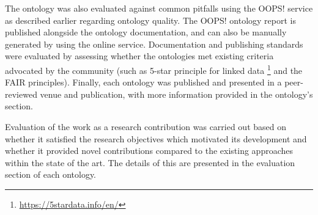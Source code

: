 The ontology was also evaluated against common pitfalls using the OOPS! service as described earlier regarding ontology quality. The OOPS! ontology report is published alongside the ontology documentation, and can also be manually generated by using the online service. Documentation and publishing standards were evaluated by assessing whether the ontologies met existing criteria advocated by the community (such as 5-star principle for linked data \footnote{\url{https://5stardata.info/en/}} and the FAIR principles). Finally, each ontology was published and presented in a peer-reviewed venue and publication, with more information provided in the ontology's section.

Evaluation of the work as a research contribution was carried out based on whether it satisfied the research objectives which motivated its development and whether it provided novel contributions compared to the existing approaches within the state of the art. The details of this are presented in the evaluation section of each ontology.

